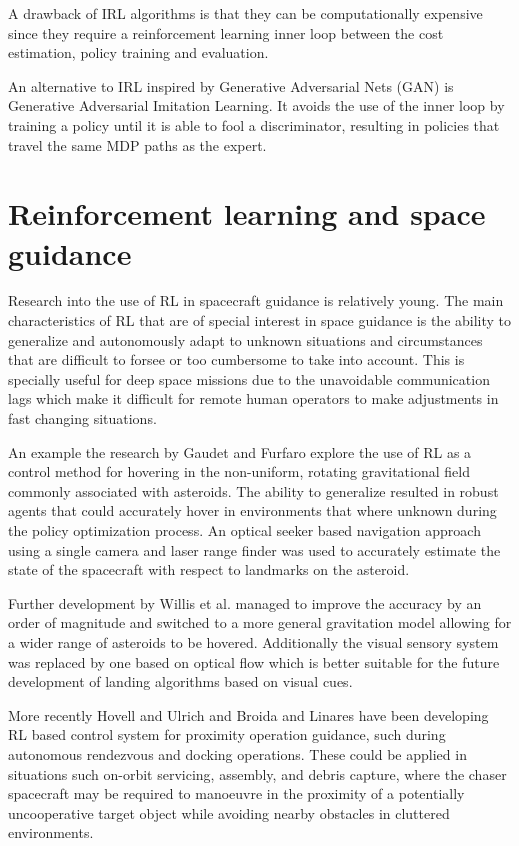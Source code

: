 A drawback of IRL algorithms is that they can be computationally expensive since they require a reinforcement learning inner loop between the cost estimation, policy training and evaluation. 

An alternative to IRL inspired by Generative Adversarial Nets (GAN) is Generative
Adversarial Imitation Learning. It avoids the use of the inner loop by training a policy until it is able to fool a discriminator, resulting in policies that travel the same MDP paths as the expert.


\section{Reinforcement learning and space guidance}
Research into the use of RL in spacecraft guidance is relatively young. The main characteristics of RL that are of special interest in space guidance is the ability to generalize and autonomously adapt to unknown situations and circumstances that are difficult to forsee or too cumbersome to take into account. This is specially useful for deep space missions due to the unavoidable communication lags which make it difficult for remote human operators to make adjustments in fast changing situations.

An example the research by Gaudet and Furfaro \cite{gaudet2012robust} explore the use of RL as a control method for hovering in the non-uniform, rotating gravitational field commonly associated with asteroids. The ability to generalize resulted in robust agents that could accurately hover in environments that where unknown during the policy optimization process. An optical seeker based navigation approach using a single camera and laser range finder was used to accurately estimate the state of the spacecraft with respect to landmarks on the asteroid.

Further development by Willis et al. \cite{willis2016reinforcement} managed to improve the accuracy by an order of magnitude and switched to a more general gravitation model allowing for a wider range of asteroids to be hovered. Additionally the visual sensory system was replaced by one based on optical flow which is better suitable for the future development of landing algorithms based on visual cues.

More recently Hovell and Ulrich \cite{hovell2020deep, hovell2021deep} and Broida and Linares \cite{broida2019spacecraft} have been developing RL based control system for proximity operation guidance, such during autonomous rendezvous and docking operations. These could be applied in situations such on-orbit servicing, assembly, and debris capture, where the chaser spacecraft may be required to manoeuvre in the proximity of a potentially uncooperative target object while avoiding nearby obstacles in cluttered environments. 

